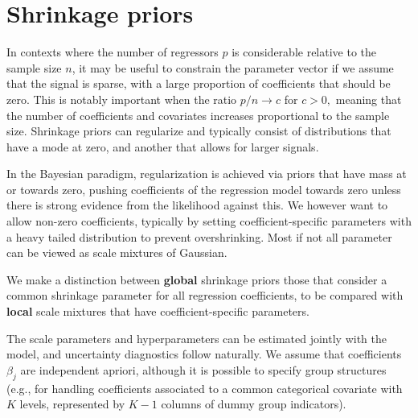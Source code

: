 \documentclass[
  11pt,
  letterpaper,
]{scrbook}
\theoremstyle{definition}
\theoremstyle{definition}
\theoremstyle{definition}
\theoremstyle{plain}
\theoremstyle{plain}
\theoremstyle{plain}
\theoremstyle{remark}
\begin{document}
\section{Shrinkage priors}\label{shrinkage-priors}

In contexts where the number of regressors \(p\) is considerable
relative to the sample size \(n\), it may be useful to constrain the
parameter vector if we assume that the signal is sparse, with a large
proportion of coefficients that should be zero. This is notably
important when the ratio \(p/n \to c\) for \(c > 0,\) meaning that the
number of coefficients and covariates increases proportional to the
sample size. Shrinkage priors can regularize and typically consist of
distributions that have a mode at zero, and another that allows for
larger signals.

In the Bayesian paradigm, regularization is achieved via priors that
have mass at or towards zero, pushing coefficients of the regression
model towards zero unless there is strong evidence from the likelihood
against this. We however want to allow non-zero coefficients, typically
by setting coefficient-specific parameters with a heavy tailed
distribution to prevent overshrinking. Most if not all parameter can be
viewed as scale mixtures of Gaussian.

We make a distinction between \textbf{global} shrinkage priors those
that consider a common shrinkage parameter for all regression
coefficients, to be compared with \textbf{local} scale mixtures that
have coefficient-specific parameters.

The scale parameters and hyperparameters can be estimated jointly with
the model, and uncertainty diagnostics follow naturally. We assume that
coefficients \(\beta_j\) are independent apriori, although it is
possible to specify group structures (e.g., for handling coefficients
associated to a common categorical covariate with \(K\) levels,
represented by \(K-1\) columns of dummy group indicators).
\end{document}
